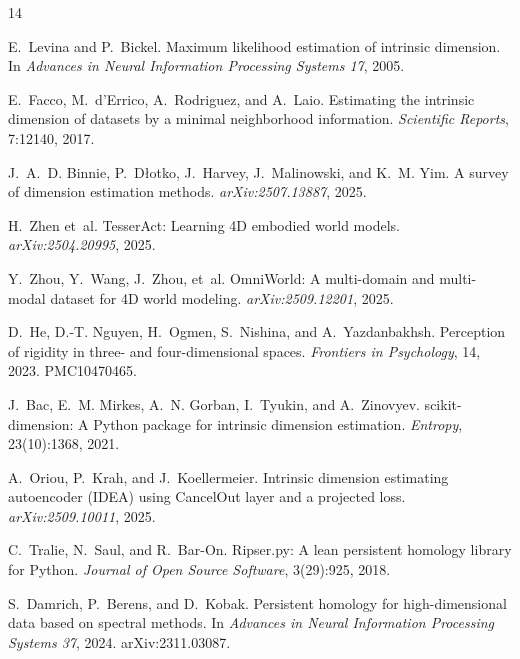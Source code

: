 \documentclass{article}
\begin{document}

\begin{thebibliography}{14}
\small

E.~Levina and P.~Bickel.
\newblock Maximum likelihood estimation of intrinsic dimension.
\newblock In \emph{Advances in Neural Information Processing Systems 17}, 2005.

E.~Facco, M.~d'Errico, A.~Rodriguez, and A.~Laio.
\newblock Estimating the intrinsic dimension of datasets by a minimal neighborhood information.
\newblock \emph{Scientific Reports}, 7:12140, 2017.

J.~A.~D. Binnie, P.~D{\l}otko, J.~Harvey, J.~Malinowski, and K.~M. Yim.
\newblock A survey of dimension estimation methods.
\newblock \emph{arXiv:2507.13887}, 2025.

H.~Zhen et~al.
\newblock TesserAct: Learning 4D embodied world models.
\newblock \emph{arXiv:2504.20995}, 2025.

Y.~Zhou, Y.~Wang, J.~Zhou, et~al.
\newblock OmniWorld: A multi-domain and multi-modal dataset for 4D world modeling.
\newblock \emph{arXiv:2509.12201}, 2025.

D.~He, D.-T. Nguyen, H.~Ogmen, S.~Nishina, and A.~Yazdanbakhsh.
\newblock Perception of rigidity in three- and four-dimensional spaces.
\newblock \emph{Frontiers in Psychology}, 14, 2023. PMC10470465.

J.~Bac, E.~M. Mirkes, A.~N. Gorban, I.~Tyukin, and A.~Zinovyev.
\newblock scikit-dimension: A Python package for intrinsic dimension estimation.
\newblock \emph{Entropy}, 23(10):1368, 2021.

A.~Oriou, P.~Krah, and J.~Koellermeier.
\newblock Intrinsic dimension estimating autoencoder (IDEA) using CancelOut layer and a projected loss.
\newblock \emph{arXiv:2509.10011}, 2025.

C.~Tralie, N.~Saul, and R.~Bar-On.
\newblock Ripser.py: A lean persistent homology library for Python.
\newblock \emph{Journal of Open Source Software}, 3(29):925, 2018.

S.~Damrich, P.~Berens, and D.~Kobak.
\newblock Persistent homology for high-dimensional data based on spectral methods.
\newblock In \emph{Advances in Neural Information Processing Systems 37}, 2024. arXiv:2311.03087.


\end{thebibliography}
\end{document}
